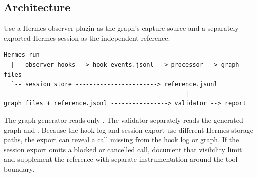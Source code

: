 \documentclass[11pt]{article}
\begin{document}
\subsection{Architecture}
Use a Hermes observer plugin as the graph's capture source and a separately exported Hermes session as the independent reference:
\begin{verbatim}
Hermes run
  |-- observer hooks --> hook_events.jsonl --> processor --> graph files
  `-- session store -----------------------> reference.jsonl
                                                   |
graph files + reference.jsonl ----------------> validator --> report
\end{verbatim}
The graph generator reads only . The validator separately reads the generated graph and . Because the hook log and session export use different Hermes storage paths, the export can reveal a call missing from the hook log or graph. If the session export omits a blocked or cancelled call, document that visibility limit and supplement the reference with separate instrumentation around the tool boundary.
\end{document}
